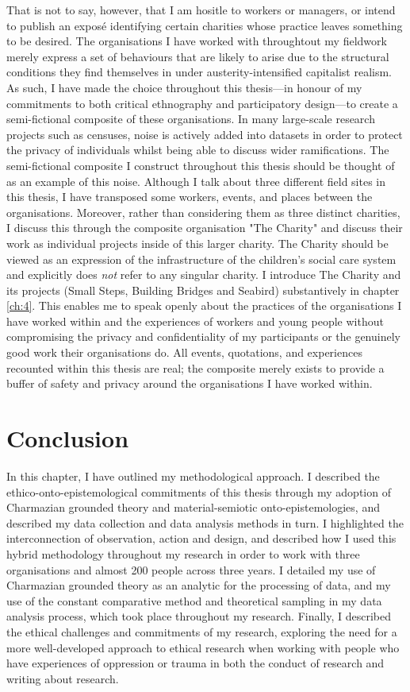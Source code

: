 That is not to say, however, that I am hositle to workers or managers, or intend to publish an exposé identifying certain charities whose practice leaves something to be desired. The organisations I have worked with throughtout my fieldwork merely express a set of behaviours that are likely to arise due to the structural conditions they find themselves in under austerity-intensified capitalist realism. As such, I have made the choice throughout this thesis—in honour of my commitments to both critical ethnography and participatory design—to create a semi-fictional composite of these organisations. In many large-scale research projects such as censuses, noise is actively added into datasets in order to protect the privacy of individuals whilst being able to discuss wider ramifications. The semi-fictional composite I construct throughout this thesis should be thought of as an example of this noise. Although I talk about three different field sites in this thesis, I have transposed some workers, events, and places between the organisations. Moreover, rather than considering them as three distinct charities, I discuss this through the composite organisation "The Charity" and discuss their work as individual projects inside of this larger charity. The Charity should be viewed as an expression of the infrastructure of the children's social care system and explicitly does \emph{not} refer to any singular charity. I introduce The Charity and its projects (Small Steps, Building Bridges and Seabird) substantively in chapter \ref{ch:4}. This enables me to speak openly about the practices of the organisations I have worked within and the experiences of workers and young people without compromising the privacy and confidentiality of my participants or the genuinely good work their organisations do. All events, quotations, and experiences recounted within this thesis are real; the composite merely exists to provide a buffer of safety and privacy  around the organisations I have worked within. 

\section{Conclusion}
\label{section:6-5-conc}
In this chapter, I have outlined my methodological approach. I described the ethico-onto-epistemological commitments of this thesis through my adoption of Charmazian grounded theory and material-semiotic onto-epistemologies, and described my data collection and data analysis methods in turn. I highlighted the interconnection of observation, action and design, and described how I used this hybrid methodology throughout my research in order to work with three organisations and almost 200 people across three years. I detailed my use of Charmazian grounded theory as an analytic for the processing of data, and my use of the constant comparative method and theoretical sampling in my data analysis process, which took place throughout my research. Finally, I described the ethical challenges and commitments of my research, exploring the need for a more well-developed approach to ethical research when working with people who have experiences of oppression or trauma in both the conduct of research and writing about research.

